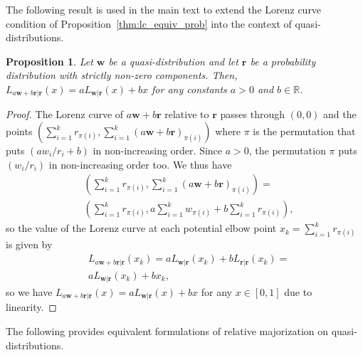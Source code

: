\documentclass[
twocolumn,
superscriptaddress
]{revtex4-1}
\newcommand{\revhigh}[1]{{\color{red}#1}}
\newtheorem{proposition}[theorem]{Proposition}
\def\r{\boldsymbol{r}}
\def\w{\boldsymbol{w}}
\begin{document}
The following result is used \revhigh{in the main text} to extend the Lorenz curve condition of Proposition~\ref{thm:lc_equiv_prob} into the context of quasi-distributions.
\begin{proposition}\label{Lorenz_linearity}
	Let $\w$ be a quasi-distribution and let $\r$ be a probability distribution with strictly non-zero components. 
	Then, $L_{a\w + b \r | \r} (x) = a L_{\w |\r}(x) + b x$ for any constants $a > 0$ and $b \in \mathbb{R}$.
\end{proposition}
\begin{proof} 
	The Lorenz curve of $a\w + b \r$ relative to $\r$ passes through $(0,0)$ and the points $(\sum_{i=1}^k{r_{\pi(i)}}, \sum_{i=1}^k(a \w + b \r)_{\pi(i)})$ where $\pi$ is the permutation that puts $(a w_i/r_i + b)$ in non-increasing order. Since $a > 0$, the permutation $\pi$ puts  $(w_i/r_i)$ in non-increasing order too. We thus have
\begin{align*}
&\left( \sum_{i=1}^k r_{\pi(i)}, \sum_{i=1}^k(a \w + b \r)_{\pi(i)} \right) = \\ 
&\left( \sum_{i=1}^k r_{\pi(i)},a \sum_{i=1}^k  w_{\pi(i)} + b\sum_{i=1}^k r_{\pi(i)} \right) \nonumber,
\end{align*}
so the value of the Lorenz curve at each potential elbow point $x_k = \sum_{i=1} ^kr_{\pi(i)}$ is given by
\begin{align}
&L_{a \w +b \r|\r} (x_k) = a L_{\w|\r} (x_k) + b L_{\r|\r}(x_k) = \nonumber\\
&a L_{\w|\r} (x_k) + b x_k,
\end{align}
so we have $L_{a\w  + b\r|\r} (x) = a L_{\w |\r}(x) + b x$ for any $x \in [0,1]$ due to linearity.
\end{proof}
	
The following provides equivalent formulations of relative majorization on quasi-distributions. 
\end{document}
